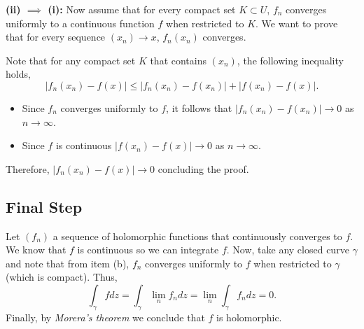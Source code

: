 \textbf{(ii) $\boldsymbol{\implies}$ (i):} Now assume that for every compact set $K \subset U$, $f_n$ converges uniformly to a continuous function $f$ when restricted to $K$. We want to prove that for every sequence $(x_n) \to x$, $f_n(x_n)$ converges.

Note that for any compact set $K$ that contains $(x_n)$, the following inequality holds,
\[ |f_n(x_n) - f(x)| \leq |f_n(x_n)-f(x_n)| + |f(x_n) - f(x)|. \]
\begin{itemize}
    \item Since $f_n$ converges uniformly to $f$, it follows that $|f_n(x_n)-f(x_n)|\to 0$ as $n\to\infty$.
    \item Since $f$ is continuous $|f(x_n) - f(x)| \to 0$ as $n \to \infty$.
\end{itemize}
Therefore, $|f_n(x_n) - f(x)| \to 0$ concluding the proof. 

\subsection*{Final Step}

Let $(f_n)$ a sequence of holomorphic functions that continuously converges to $f$. We know that $f$ is continuous so we can integrate $f$. Now, take any closed curve $\gamma$ and note that from item (b), $f_n$ converges uniformly to $f$ when restricted to $\gamma$ (which is compact). Thus,
\[ \int_\gamma f dz = \int_\gamma \lim_n f_n dz = \lim_n \int_\gamma f_n dz = 0. \]
Finally, by \textit{Morera's theorem} we conclude that $f$ is holomorphic.